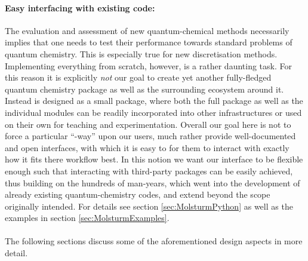 \paragraph{Easy interfacing with existing code:}
The evaluation and assessment of new \linebreak quantum-chemical methods
necessarily implies that one needs to test their performance
towards standard problems of quantum chemistry.
This is especially true for new discretisation methods.
Implementing everything from scratch,
however, is a rather daunting task.
For this reason it is explicitly \emph{not} our goal
to create yet another fully-fledged quantum chemistry package
as well as the surrounding ecosystem around it.
Instead \molsturm is designed as a small package,
where both the full package as well as the individual modules
can be readily incorporated into other infrastructures
or used on their own for teaching and experimentation.
Overall our goal here is not to force a particular ``\molsturm-way'' upon
our users,
much rather provide well-documented and open interfaces,
with which it is easy to for them to interact with \molsturm
exactly how it fits there workflow best.
In this notion we want our \molsturm interface
to be flexible enough such that interacting
with third-party packages can be easily achieved,
thus building on the hundreds of man-years,
which went into the development of already existing quantum-chemistry codes,
and extend \molsturm beyond the scope originally intended.
For details see section \vref{sec:MolsturmPython}
as well as the examples in section \vref{sec:MolsturmExamples}.
%
%
\paragraph*{}
The following sections discuss some of the
aforementioned design aspects in more detail.

